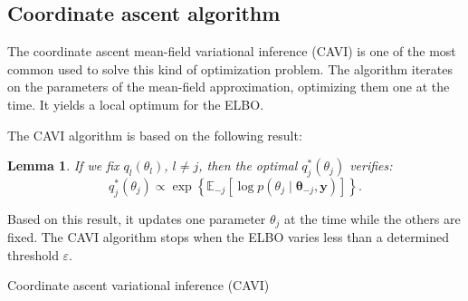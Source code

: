 \documentclass{article}
\numberwithin{equation}{section}
\newtheorem{lemma}{Lemma}[section]
\begin{document}
\subsection{Coordinate ascent algorithm}
The coordinate ascent mean-field variational inference (\small{CAVI}) is one of the most common used to solve this kind of optimization problem. The algorithm iterates on the parameters of the mean-field approximation, optimizing them one at the time. It yields a local optimum for the \small{ELBO}.

The \small{CAVI} algorithm is based on the following result:
\begin{lemma}

If we fix $q_l(\theta_l)$, $l\neq j$, then the optimal $q^*_j(\theta_j)$ verifies:
\begin{equation*}
q^*_j(\theta_j) \propto \exp\left\lbrace\mathbb{E}_{-j}\left[\log p(\theta_j \mid \boldsymbol{\theta}_{-j}, \boldsymbol{y})\right]\right\rbrace.
\end{equation*}

\end{lemma}

Based on this result, it updates one parameter $\theta_j$ at the time while the others are fixed. The CAVI algorithm stops when the \small{ELBO} varies less than a determined threshold $\varepsilon$.\\
\newline
\begin{algorithm}
\BlankLine
{}
\BlankLine
{}
\BlankLine
{}
\caption{Coordinate ascent variational inference (\small{CAVI})\label{algo:CAVI}}
\end{algorithm}
\end{document}
